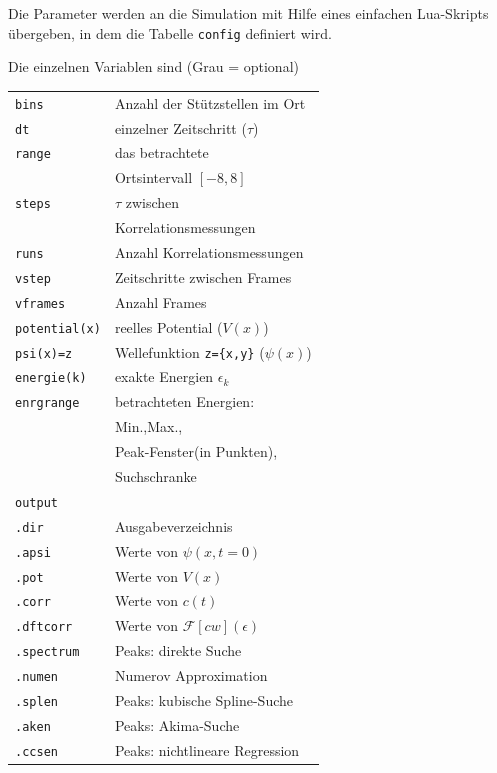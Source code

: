 \documentclass[10pt,a4paper,german]{scrartcl}
\begin{document}
  			Die Parameter werden an die Simulation mit Hilfe eines einfachen
	  		Lua-Skripts übergeben, in dem die Tabelle 
		  	\lstinline!config! definiert wird.
			  
  			Die einzelnen Variablen sind (Grau = optional)
			
	  		\begin{tabular}{ll}
		  		\lstinline!bins! & Anzahl der Stützstellen im Ort\\
			  	\lstinline!dt!   & einzelner Zeitschritt ($\tau$)\\
				  \lstinline!range!& das betrachtete \\
	  			                 & Ortsintervall $[-8,8]$\\
  				\lstinline!steps!& $\tau$ zwischen \\
		  		                 & Korrelationsmessungen\\
			  	\lstinline!runs!& Anzahl Korrelationsmessungen\\
				  \rowcolor{lightgray}
  				\lstinline!vstep!& Zeitschritte zwischen Frames\\
	  			\rowcolor{lightgray}
		  		\lstinline!vframes!& Anzahl Frames\\
			  	\lstinline!potential(x)!& reelles Potential ($V(x)$)\\
				  \lstinline!psi(x)=z!& Wellefunktion \lstinline!z={x,y}! ($\psi(x)$)\\
  				\rowcolor{lightgray}
	  			\lstinline!energie(k)!& exakte Energien $\epsilon_k$\\
		  		\lstinline!enrgrange!& betrachteten Energien:\\
          				 & Min.,Max.,\\
				           & Peak-Fenster(in Punkten),\\
				           & Suchschranke\\
  				\lstinline!output!& \\
	  			\lstinline!.dir!& Ausgabeverzeichnis\\
		  		\rowcolor{lightgray}
			  	\lstinline!.apsi!& Werte von $\psi(x,t=0)$\\
				  \rowcolor{lightgray}
  				\lstinline!.pot!& Werte von $V(x)$\\
	  			\rowcolor{lightgray}
		  		\lstinline!.corr!& Werte von $c(t)$\\
			  	\rowcolor{lightgray}
  				\lstinline!.dftcorr!& Werte von $\mathcal{F}[cw](\epsilon)$ \\
	  			\rowcolor{lightgray}
		  		\lstinline!.spectrum!& Peaks: direkte Suche \\
			  	\rowcolor{lightgray}
				  \lstinline!.numen!& Numerov Approximation \\
  				\rowcolor{lightgray}
	  			\lstinline!.splen!& Peaks: kubische Spline-Suche \\
		  		\rowcolor{lightgray}
			  	\lstinline!.aken!& Peaks: Akima-Suche \\
				  \rowcolor{lightgray}
  				\lstinline!.ccsen!& Peaks: nichtlineare Regression \\
	  		\end{tabular}
  
\end{document}
